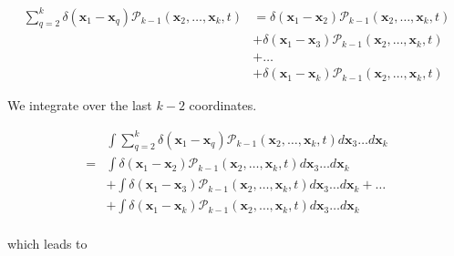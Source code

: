 \begin{subequations} 
\begin{align}
\sum_{q=2}^{k}\delta({\boldsymbol{x}_1-\boldsymbol{x}_q})\mathcal{P}_{k-1}(\boldsymbol{x}_{2},\ldots,\boldsymbol{x}_{k},t) & =\delta(\boldsymbol{x}_{1}-\boldsymbol{x}_{2})\mathcal{P}_{k-1}(\boldsymbol{x}_{2},\ldots,\boldsymbol{x}_{k},t)\\
 & +\delta(\boldsymbol{x}_{1}-\boldsymbol{x}_{3})\mathcal{P}_{k-1}(\boldsymbol{x}_{2},\ldots,\boldsymbol{x}_{k},t)\\
 & +\ldots\\
 & +\delta(\boldsymbol{x}_{1}-\boldsymbol{x}_{k})\mathcal{P}_{k-1}(\boldsymbol{x}_{2},\ldots,\boldsymbol{x}_{k},t)
\end{align}
\end{subequations}

\vspace{1.25em}

We integrate over the last $k-2$ coordinates.

\begin{subequations} 
\begin{flalign}
 & \int\sum_{q=2}^{k}\delta({\boldsymbol{x}_1-\boldsymbol{x}_q})\mathcal{P}_{k-1}(\boldsymbol{x}_{2},\ldots,\boldsymbol{x}_{k},t)d\boldsymbol{x}_{3}\ldots d\boldsymbol{x}_{k}\\
= & \int\delta(\boldsymbol{x}_{1}-\boldsymbol{x}_{2})\mathcal{P}_{k-1}(\boldsymbol{x}_{2},\ldots,\boldsymbol{x}_{k},t)d\boldsymbol{x}_{3}\ldots d\boldsymbol{x}_{k}\\
 & +\int\delta(\boldsymbol{x}_{1}-\boldsymbol{x}_{3})\mathcal{P}_{k-1}(\boldsymbol{x}_{2},\ldots,\boldsymbol{x}_{k},t)d\boldsymbol{x}_{3}\ldots d\boldsymbol{x}_{k}+\ldots\\
 & +\int\delta(\boldsymbol{x}_{1}-\boldsymbol{x}_{k})\mathcal{P}_{k-1}(\boldsymbol{x}_{2},\ldots,\boldsymbol{x}_{k},t)d\boldsymbol{x}_{3}\ldots d\boldsymbol{x}_{k}\\
\end{flalign}
\end{subequations}

which leads to

